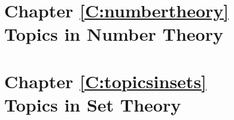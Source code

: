 \documentclass[11pt,openany]{book}
\begin{document}
\chapter*{Chapter \ref{C:numbertheory} \\Topics in Number Theory}




\chapter*{Chapter \ref{C:topicsinsets} \\Topics in Set Theory}



\end{document}
